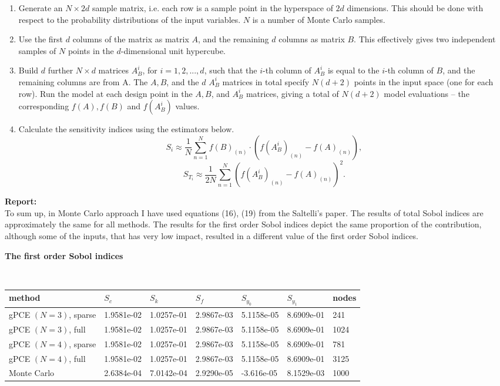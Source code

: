 \documentclass[11pt]{article}
\newcommand{\report}{\textbf{Report: \\}}
\begin{document}
\begin{enumerate}
    \item Generate an $N \times 2d$ sample matrix, i.e. each row is a sample point in the hyperspace of $2d$ dimensions. This should be done with respect to the probability distributions of the input variables. $N$ is a number of Monte Carlo samples.
    \item Use the first $d$ columns of the matrix as matrix $A$, and the remaining $d$ columns as matrix $B$. This effectively gives two independent samples of $N$ points in the $d$-dimensional unit hypercube.
    \item Build $d$ further $N \times d$ matrices $A_B^i$, for $i = 1,2,...,d$, such that the $i$-th column of $A_B^i$ is equal to the $i$-th column of $B$, and the remaining columns are from A.
    The $A, B$, and the $d$ $A_B^i$ matrices in total specify $N(d+2)$ points in the input space (one for each row). Run the model at each design point in the $A, B$, and $A_B^i$ matrices, giving a total of $N(d+2)$ model evaluations – the corresponding $f(A), f(B)$ and $f(A_B^i)$ values.
    \item Calculate the sensitivity indices using the estimators below.
    $$S_i \approx \frac{1}{N} \sum_{n = 1}^{N} f(B)_{(n)} \cdot (f(A_B^i)_{(n)}-f(A)_{(n)}),$$
    $$S_T_i \approx \frac{1}{2N} \sum_{n = 1}^{N} (f(A_B^i)_{(n)}-f(A)_{(n)})^2.$$
\end{enumerate}
\report
To sum up, in Monte Carlo approach I have used equations (16), (19) from the Saltelli's paper.
The results of total Sobol indices are approximately the same for all methods. The results for the first order Sobol indices depict the same proportion of the contribution, although some of the inputs, that has very low impact, resulted in a different value of the first order Sobol indices.
\begin{center} \textbf{The first order Sobol indices}\\
\end{center}
\\
\begin{tabular}{|p{4.0cm}|p{2.2cm}|p{2.2cm}|p{2.2cm}|p{2.2cm}|p{2.2cm}|p{1.0cm}|}
\hline
method & $S_c$ & $S_k$ & $S_f$ & $S_y_0$ & $S_y_1$ & nodes \\
\hline
gPCE $(N=3)$, sparse &  1.9581e-02 &1.0257e-01 &2.9867e-03 &5.1158e-05
 &8.6909e-01 & 241 \\
gPCE $(N=3)$, full & 1.9581e-02 &1.0257e-01& 2.9867e-03& 5.1158e-05&
 8.6909e-01 & 1024 \\
gPCE $(N=4)$, sparse & 1.9581e-02& 1.0257e-01& 2.9867e-03& 5.1158e-05&
 8.6909e-01 & 781\\
gPCE $(N=4)$, full & 1.9581e-02& 1.0257e-01&2.9867e-03 &5.1158e-05&
 8.6909e-01 & 3125\\
Monte Carlo &  2.6384e-04 &  7.0142e-04 & 2.9290e-05 &-3.616e-05 &
  8.1529e-03 & 1000\\
\hline
\end{tabular}
\end{document}
